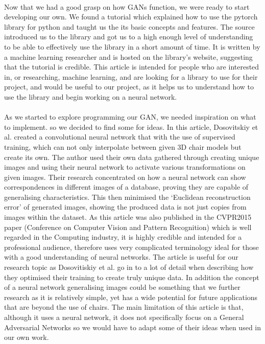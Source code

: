 \documentclass{article}
\begin{document}
\paragraph{}
Now that we had a good grasp on how GANs function, we were ready to start developing our own. We found a tutorial\cite{blitz} which explained how to use the pytorch library for python and taught us the its basic concepts and features. The source introduced us to the library and got us to a high enough level of understanding to be able to effectively use the library in a short amount of time. It is written by a machine learning researcher and is hosted on the library’s website, suggesting that the tutorial is credible. This article is intended for people who are interested in, or researching, machine learning, and are looking for a library to use for their project, and would be useful to our project, as it helps us to understand how to use the library and begin working on a neural network.

\paragraph{}
As we started to explore programming our GAN, we needed inspiration on what to implement. so we decided to find some for ideas. In this article\cite{chairs}, Dosovitskiy et al. created a convolutional neural network that with the use of supervised training, which can not only interpolate between given 3D chair models but create its own. The author used their own data gathered through creating unique images and using their neural network to activate various transformations on given images. Their research concentrated on how a neural network can show correspondences in different images of a database, proving they are capable of generalising characteristics. This then minimised the ‘Euclidean reconstruction error’ of generated images, showing the produced data is not just copies from images within the dataset. As this article was also published in the CVPR2015 paper (Conference on Computer Vision and Pattern Recognition) which is well regarded in the Computing industry, it is highly credible and intended for a professional audience, therefore uses very complicated terminology ideal for those with a good understanding of neural networks. The article is useful for our research topic as Dosovitiskiy et al. go in to a lot of detail when describing how they optimised their training to create truly unique data. In addition the concept of a neural network generalising images could be something that we further research as it is relatively simple, yet has a wide potential for future applications that are beyond the use of chairs. The main limitation of this article is that, although it uses a neural network, it does not specifically focus on a General Adversarial Networks so we would have to adapt some of their ideas when used in our own work.
\end{document}
